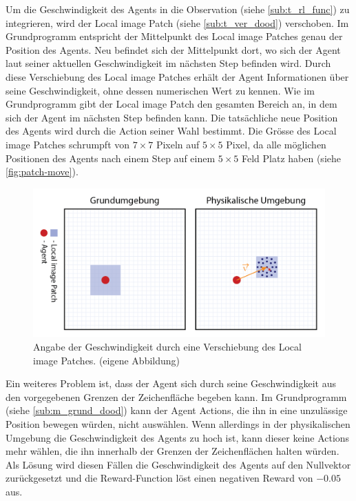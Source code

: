 Um die Geschwindigkeit des Agents in die Observation (siehe
\ref{sub:t_rl_func}) zu integrieren, wird der Local image Patch (siehe
\ref{sub:t_ver_dood}) verschoben. Im Grundprogramm entspricht der
Mittelpunkt des Local image Patches genau der Position des Agents. Neu befindet
sich der Mittelpunkt dort, wo sich der Agent laut seiner aktuellen
Geschwindigkeit im nächsten Step befinden wird. Durch diese Verschiebung des
Local image Patches erhält der Agent Informationen über seine Geschwindigkeit,
ohne dessen numerischen Wert zu kennen. Wie im Grundprogramm gibt der Local
image Patch den gesamten Bereich an, in dem sich der Agent im nächsten Step
befinden kann. Die tatsächliche neue Position des Agents wird durch die Action
seiner Wahl bestimmt. Die Grösse des Local image Patches schrumpft von
$7\times7$ Pixeln auf $5\times5$ Pixel, da alle möglichen Positionen des Agents
nach einem Step auf einem $5\times5$ Feld Platz haben (siehe
\autoref{fig:patch-move}).
 
\begin{figure}[!ht]
 \centering
 \includegraphics[width=\textwidth]{images/methode/patch-move.png}
 \caption{Angabe der Geschwindigkeit durch eine Verschiebung des Local image Patches. (eigene Abbildung)}\label{fig:patch-move}
\end{figure}
 
Ein weiteres Problem ist, dass der Agent sich durch seine Geschwindigkeit aus
den vorgegebenen Grenzen der Zeichenfläche begeben kann. Im Grundprogramm 
(siehe \ref{sub:m_grund_dood}) kann der Agent Actions, die ihn in eine
unzulässige Position bewegen würden, nicht auswählen. Wenn allerdings in der
physikalischen Umgebung die Geschwindigkeit des Agents zu hoch ist, kann dieser
keine Actions mehr wählen, die ihn innerhalb der Grenzen der Zeichenflächen
halten würden. Als Lösung wird diesen Fällen die Geschwindigkeit des Agents auf den
Nullvektor zurückgesetzt und die Reward-Function löst einen negativen Reward von
$-0.05$ aus.

